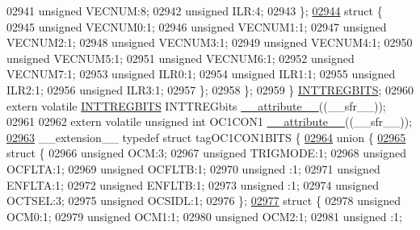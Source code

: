 \begin{DoxyCode}
02941       \textcolor{keywordtype}{unsigned} VECNUM:8;
02942       \textcolor{keywordtype}{unsigned} ILR:4;
02943     \};
\hypertarget{a00015_source_l02944}{}\hyperlink{a00015}{02944}     \textcolor{keyword}{struct }\{
02945       \textcolor{keywordtype}{unsigned} VECNUM0:1;
02946       \textcolor{keywordtype}{unsigned} VECNUM1:1;
02947       \textcolor{keywordtype}{unsigned} VECNUM2:1;
02948       \textcolor{keywordtype}{unsigned} VECNUM3:1;
02949       \textcolor{keywordtype}{unsigned} VECNUM4:1;
02950       \textcolor{keywordtype}{unsigned} VECNUM5:1;
02951       \textcolor{keywordtype}{unsigned} VECNUM6:1;
02952       \textcolor{keywordtype}{unsigned} VECNUM7:1;
02953       \textcolor{keywordtype}{unsigned} ILR0:1;
02954       \textcolor{keywordtype}{unsigned} ILR1:1;
02955       \textcolor{keywordtype}{unsigned} ILR2:1;
02956       \textcolor{keywordtype}{unsigned} ILR3:1;
02957     \};
02958   \};
02959 \} \hyperlink{a00014_d1/d69/a00507}{INTTREGBITS};
02960 \textcolor{keyword}{extern} \textcolor{keyword}{volatile} \hyperlink{a00014_d1/d69/a00507}{INTTREGBITS} INTTREGbits \hyperlink{a00015_a493c46f03454991ccc5aa7a6e1dfb2a7}{\_\_attribute\_\_}((\_\_sfr\_\_));
02961 
02962 \textcolor{keyword}{extern} \textcolor{keyword}{volatile} \textcolor{keywordtype}{unsigned} \textcolor{keywordtype}{int}  OC1CON1 \hyperlink{a00015_a493c46f03454991ccc5aa7a6e1dfb2a7}{\_\_attribute\_\_}((\_\_sfr\_\_));
\hypertarget{a00015_source_l02963}{}\hyperlink{a00014}{02963} \_\_extension\_\_ \textcolor{keyword}{typedef} \textcolor{keyword}{struct }tagOC1CON1BITS \{
\hypertarget{a00015_source_l02964}{}\hyperlink{a00015}{02964}   \textcolor{keyword}{union }\{
\hypertarget{a00015_source_l02965}{}\hyperlink{a00015}{02965}     \textcolor{keyword}{struct }\{
02966       \textcolor{keywordtype}{unsigned} OCM:3;
02967       \textcolor{keywordtype}{unsigned} TRIGMODE:1;
02968       \textcolor{keywordtype}{unsigned} OCFLTA:1;
02969       \textcolor{keywordtype}{unsigned} OCFLTB:1;
02970       \textcolor{keywordtype}{unsigned} :1;
02971       \textcolor{keywordtype}{unsigned} ENFLTA:1;
02972       \textcolor{keywordtype}{unsigned} ENFLTB:1;
02973       \textcolor{keywordtype}{unsigned} :1;
02974       \textcolor{keywordtype}{unsigned} OCTSEL:3;
02975       \textcolor{keywordtype}{unsigned} OCSIDL:1;
02976     \};
\hypertarget{a00015_source_l02977}{}\hyperlink{a00015}{02977}     \textcolor{keyword}{struct }\{
02978       \textcolor{keywordtype}{unsigned} OCM0:1;
02979       \textcolor{keywordtype}{unsigned} OCM1:1;
02980       \textcolor{keywordtype}{unsigned} OCM2:1;
02981       \textcolor{keywordtype}{unsigned} :1;

\end{DoxyCode}
